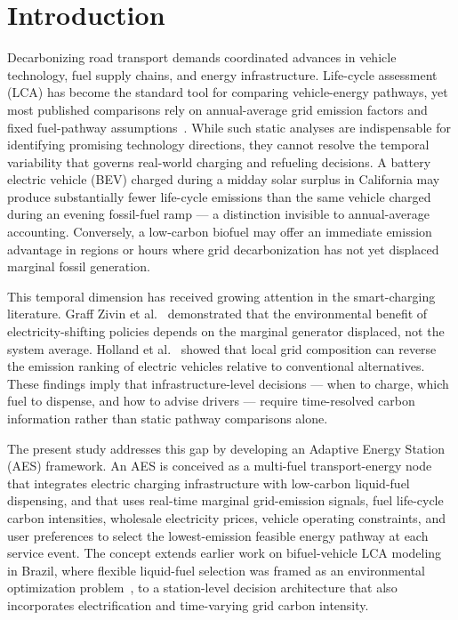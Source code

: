 \documentclass[cleantechnol,article,submit,pdftex,moreauthors]{Definitions/mdpi}
\begin{document}
\section{Introduction}
\label{sec:introduction}

Decarbonizing road transport demands coordinated advances in vehicle technology, fuel supply chains, and energy infrastructure. Life-cycle assessment (LCA) has become the standard tool for comparing vehicle-energy pathways, yet most published comparisons rely on annual-average grid emission factors and fixed fuel-pathway assumptions~\cite{Elgowainy2018}. While such static analyses are indispensable for identifying promising technology directions, they cannot resolve the temporal variability that governs real-world charging and refueling decisions. A battery electric vehicle (BEV) charged during a midday solar surplus in California may produce substantially fewer life-cycle emissions than the same vehicle charged during an evening fossil-fuel ramp --- a distinction invisible to annual-average accounting. Conversely, a low-carbon biofuel may offer an immediate emission advantage in regions or hours where grid decarbonization has not yet displaced marginal fossil generation.

This temporal dimension has received growing attention in the smart-charging literature. Graff Zivin et al.~\cite{GraffZivin2014} demonstrated that the environmental benefit of electricity-shifting policies depends on the marginal generator displaced, not the system average. Holland et al.~\cite{Holland2016} showed that local grid composition can reverse the emission ranking of electric vehicles relative to conventional alternatives. These findings imply that infrastructure-level decisions --- when to charge, which fuel to dispense, and how to advise drivers --- require time-resolved carbon information rather than static pathway comparisons alone.

The present study addresses this gap by developing an Adaptive Energy Station (AES) framework. An AES is conceived as a multi-fuel transport-energy node that integrates electric charging infrastructure with low-carbon liquid-fuel dispensing, and that uses real-time marginal grid-emission signals, fuel life-cycle carbon intensities, wholesale electricity prices, vehicle operating constraints, and user preferences to select the lowest-emission feasible energy pathway at each service event. The concept extends earlier work on bifuel-vehicle LCA modeling in Brazil, where flexible liquid-fuel selection was framed as an environmental optimization problem~\cite{Bernardes2009}, to a station-level decision architecture that also incorporates electrification and time-varying grid carbon intensity.
\end{document}
